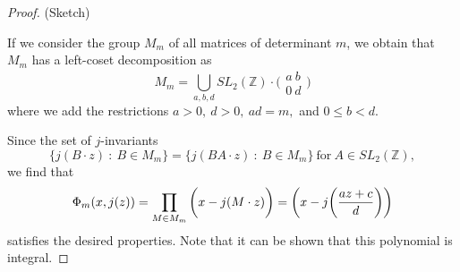 \documentclass{article}
\newtheorem{Prop}{Proposition}
\newcommand{\z}{\mathbb{Z}}
\begin{document}
\begin{proof} (Sketch)



If we consider the group $M_m$ of all matrices of determinant $m$,
we obtain that $M_m$ has a left-coset decomposition as
$$M_m = \bigcup_{a,b,d} SL_2(\z)\cdot \bigg(\begin{matrix}a~b \\ 0~d\end{matrix}\bigg)$$ where we add the
restrictions $a > 0,~ d > 0,~ ad = m,$ and $0 \leq b < d$.

Since the set of $j$-invariants $$\bigg\{j(B\cdot z) ~ :~ B \in
M_m\bigg\} = \bigg\{j(BA\cdot z) ~ :~ B \in M_m\bigg\}
\mathrm{~for~}A\in SL_2(\z),$$ we find that
$$\Phi_m(x,j(z)) = \prod_{M\in M_m} \bigg(x- j(M\cdot z)\bigg) = \bigg(x - j\bigg({az + c \over d}\bigg)\bigg)$$
satisfies the desired properties.  Note that it can be shown that this polynomial is integral.
\end{proof}





\end{document}
